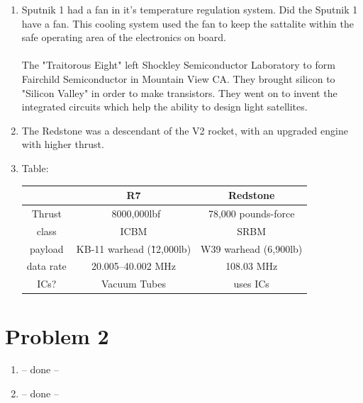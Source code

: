 \documentclass{article}
\begin{document}
\begin{enumerate}[label=(\alph*)]
\item Sputnik 1 had a fan in it's temperature regulation system. Did the Sputnik 1 have a fan. This cooling system used the fan to keep the sattalite within the safe operating area of the electronics on board.   \\ \\
The "Traitorous Eight" left Shockley Semiconductor Laboratory to form Fairchild Semiconductor in Mountain View CA. They brought silicon to "Silicon Valley" in order to make transistors. They went on to invent the integrated circuits which help the ability to design light satellites. 

\item The Redstone was a descendant of the V2 rocket, with an upgraded engine with higher thrust. 

\item Table:
\begin{center}
	\begin{tabular}{ |c||c c| } 
		\hline
		           & R7 & Redstone \\
		\hline
		\hline
		Thrust     & ~8000,000lbf               & 78,000 pounds-force \\ 
		class      & ICBM                       & SRBM \\
		payload    & KB-11 warhead (\~12,000lb) & W39 warhead (6,900lb) \\
		data rate  & 20.005–40.002 MHz          & 108.03 MHz \\
		ICs?       & Vacuum Tubes               & uses ICs \\
		\hline
	\end{tabular}
\end{center}
\end{enumerate}
\newpage

\section*{Problem 2}
\begin{enumerate}[label=(\alph*)]
	\item -- done --
	\item -- done --
\end{enumerate}
\end{document}
